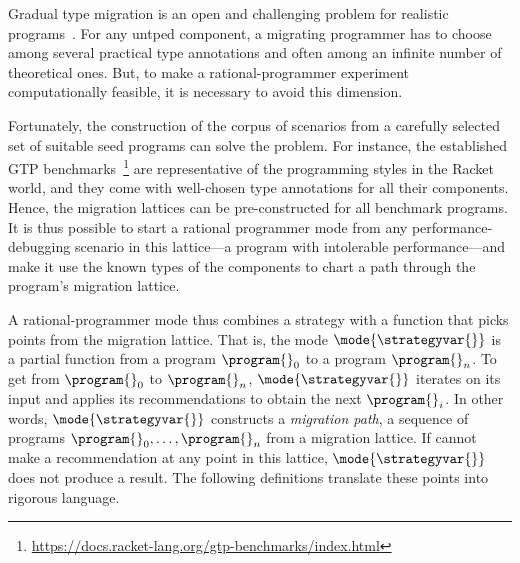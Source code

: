 \newcommand{\gtpurl}{\url{https://docs.racket-lang.org/gtp-benchmarks/index.html}}

Gradual type migration is an open and challenging problem for realistic
programs~\cite{rch:in-out-infer-gt, km:ts-type-evo,
mp:gt-decidable, ccew:gt-migrate, gc:gt-infer,
cagg-solver-based-migration,clps-popl-2020,js-infer,ruby-static-infer,unif-infer,
msi:gt-infer-hm,dyn-infer-ruby,profile-guided-typing,jstrace,gen-ts-decl,
lambdanet,nl2ptype,learn-types-big-data,ml-ts}. For
any untped component, a migrating programmer has to choose among several
practical type annotations and often among an infinite number of theoretical
ones. But, to make a rational-programmer experiment computationally feasible, it
is necessary to avoid this dimension.

Fortunately, the construction of the corpus of scenarios from a carefully
selected set of suitable seed programs can solve the problem. For instance, the
established GTP benchmarks~\cite{gtnffvf-jfp-2019}\footnote{\gtpurl{}} are
representative of the programming styles in the Racket world, and they come with
well-chosen type annotations for all their components.  Hence, the migration
lattices can be pre-constructed for all benchmark programs.  It is thus possible
to start a rational programmer mode from any performance-debugging scenario in
this lattice---a program with intolerable performance---and make it use the
known types of the components to chart a path through the program's migration
lattice.

A rational-programmer mode thus combines a strategy \strategyvar{} with a
function that picks points from the migration lattice. That is, the mode
$\mode{\strategyvar{}}$ is a partial function from a program $\program{}_0$ to a
program $\program{}_n$. To get from $\program{}_0$ to $\program{}_n$,
$\mode{\strategyvar{}}$ iterates \strategyvar{} on its input and applies its
recommendations to obtain the next $\program{}_i$.  In other words, $\mode{\strategyvar{}}$
constructs a \emph{migration path}, a sequence of programs ${\program{}_0},
\ldots, {\program{}_n}$ from a migration lattice. If \strategyvar{} cannot make
a recommendation at any point in this lattice, $\mode{\strategyvar{}}$ does not
produce a result. The following definitions translate these points into rigorous
language. 

